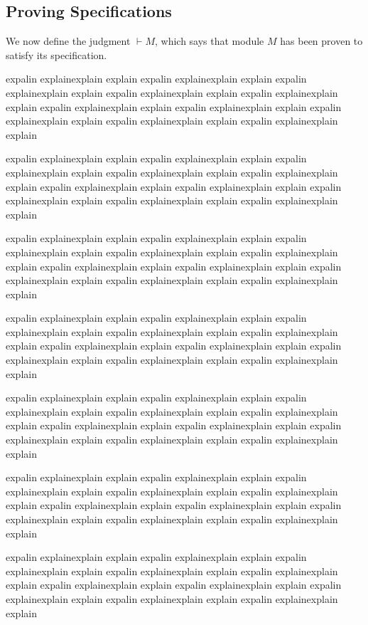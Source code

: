 {\subsection{Proving \SpecLang Specifications}
\label{sect:wf}

We now define the judgment $\vdash M$, which says that module $M$ has been proven to satisfy its specification.

expalin explainexplain explain expalin explainexplain explain expalin explainexplain explain expalin explainexplain explain
expalin explainexplain explain expalin explainexplain explain expalin explainexplain explain expalin explainexplain explain
expalin explainexplain explain expalin explainexplain explain

expalin explainexplain explain expalin explainexplain explain expalin explainexplain explain expalin explainexplain explain
expalin explainexplain explain expalin explainexplain explain expalin explainexplain explain expalin explainexplain explain
expalin explainexplain explain expalin explainexplain explain

expalin explainexplain explain expalin explainexplain explain expalin explainexplain explain expalin explainexplain explain
expalin explainexplain explain expalin explainexplain explain expalin explainexplain explain expalin explainexplain explain
expalin explainexplain explain expalin explainexplain explain

expalin explainexplain explain expalin explainexplain explain expalin explainexplain explain expalin explainexplain explain
expalin explainexplain explain expalin explainexplain explain expalin explainexplain explain expalin explainexplain explain
expalin explainexplain explain expalin explainexplain explain

expalin explainexplain explain expalin explainexplain explain expalin explainexplain explain expalin explainexplain explain
expalin explainexplain explain expalin explainexplain explain expalin explainexplain explain expalin explainexplain explain
expalin explainexplain explain expalin explainexplain explain

expalin explainexplain explain expalin explainexplain explain expalin explainexplain explain expalin explainexplain explain
expalin explainexplain explain expalin explainexplain explain expalin explainexplain explain expalin explainexplain explain
expalin explainexplain explain expalin explainexplain explain

expalin explainexplain explain expalin explainexplain explain expalin explainexplain explain expalin explainexplain explain
expalin explainexplain explain expalin explainexplain explain expalin explainexplain explain expalin explainexplain explain
expalin explainexplain explain expalin explainexplain explain


}

